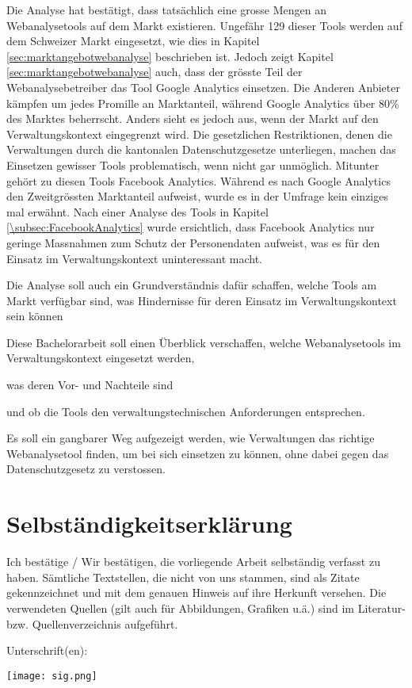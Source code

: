 Die Analyse hat bestätigt, dass tatsächlich eine grosse Mengen an Webanalysetools auf dem Markt existieren. Ungefähr 129 dieser Tools werden auf dem Schweizer Markt eingesetzt, wie dies in Kapitel \ref{sec:marktangebotwebanalyse} beschrieben ist. Jedoch zeigt Kapitel \ref{sec:marktangebotwebanalyse} auch, dass der grösste Teil der Webanalysebetreiber das Tool Google Analytics einsetzen. Die Anderen Anbieter kämpfen um jedes Promille an Marktanteil, während Google Analytics über 80\% des Marktes beherrscht. Anders sieht es jedoch aus, wenn der Markt auf den Verwaltungskontext eingegrenzt wird. Die gesetzlichen Restriktionen, denen die Verwaltungen durch die kantonalen Datenschutzgesetze unterliegen, machen das Einsetzen gewisser Tools problematisch, wenn nicht gar unmöglich. Mitunter gehört zu diesen Tools Facebook Analytics. Während es nach Google Analytics den Zweitgrössten Marktanteil aufweist, wurde es in der Umfrage kein einziges mal erwähnt. Nach einer Analyse des Tools in Kapitel \ref{\subsec:FacebookAnalytics} wurde ersichtlich, dass Facebook Analytics nur geringe Massnahmen zum Schutz der Personendaten aufweist, was es für den Einsatz im Verwaltungskontext uninteressant macht.

Die Analyse soll auch ein Grundverständnis dafür schaffen, welche Tools am 
Markt verfügbar sind, was Hindernisse für deren Einsatz im Verwaltungskontext sein können

Diese Bachelorarbeit soll einen Überblick verschaffen, welche Webanalysetools im Verwaltungskontext eingesetzt werden,

was deren Vor- und Nachteile sind

und ob die Tools den verwaltungstechnischen Anforderungen entsprechen.

Es soll ein gangbarer Weg aufgezeigt werden, wie Verwaltungen das richtige Webanalysetool finden, um bei sich einsetzen zu können, ohne dabei gegen das Datenschutzgesetz zu verstossen.


\chapter{Selbständigkeitserklärung}

Ich bestätige / Wir bestätigen, die vorliegende Arbeit selbständig verfasst zu haben. Sämtliche Textstellen, die nicht von uns stammen, sind als Zitate gekennzeichnet und mit dem genauen Hinweis auf ihre Herkunft versehen. Die verwendeten Quellen (gilt auch für Abbildungen, Grafiken u.ä.) sind im Literatur- bzw. Quellenverzeichnis aufgeführt.



Unterschrift(en):

\texttt{[image: sig.png]}